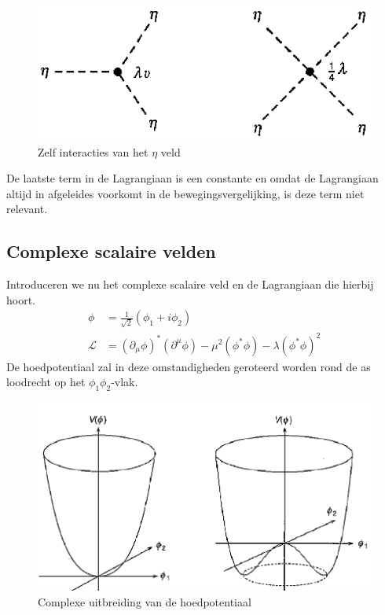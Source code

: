 \documentclass[../main.tex]{subfiles}
\begin{document}
\begin{figure}[h]
    \centering
    \includegraphics[width=0.4\linewidth]{higgs_boson/zelf_int_eta.png}
    \caption{Zelf interacties van het $\eta$ veld}%
    \label{fig:higgs_boson/zelf_int_eta}
\end{figure}

De laatste term in de Lagrangiaan is een constante en omdat de Lagrangiaan altijd in afgeleides voorkomt in de bewegingsvergelijking, is deze term niet relevant.

\subsection{Complexe scalaire velden}%
\label{sub:complexe_scalaire_velden}

Introduceren we nu het complexe scalaire veld en de Lagrangiaan die hierbij hoort.
\begin{equation}
    \begin{aligned}
        \label{eq:complex_scalair_veld}
        \phi &= \frac{1}{\sqrt{2}} (\phi_1 + i\phi_2)\\
        \mathcal{L} &= (\partial_\mu \phi)^*(\partial^\mu\phi) - \mu^2(\phi^*\phi) - \lambda(\phi^*\phi)^2
    \end{aligned}
\end{equation}
De hoedpotentiaal zal in deze omstandigheden geroteerd worden rond de as loodrecht op het $\phi_1\phi_2$-vlak.

\begin{figure}[h]
    \centering
    \includegraphics[width=0.6\linewidth]{higgs_boson/hoed_pot_comp.png}
    \caption{Complexe uitbreiding van de hoedpotentiaal}%
    \label{fig:higgs_boson/hoed_pot_comp}
\end{figure}
\end{document}
